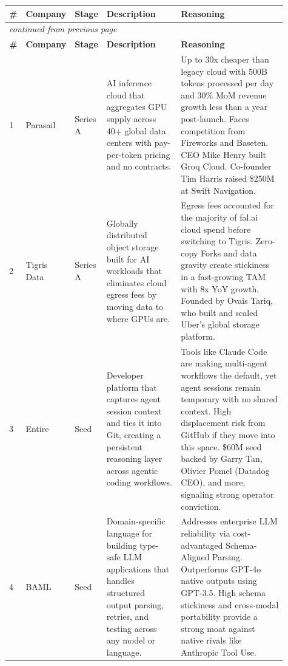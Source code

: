 \documentclass[11pt, letterpaper]{article}
\begin{document}
\begin{longtable}{@{} p{0.04\linewidth} p{0.10\linewidth} p{0.07\linewidth}
                      p{0.28\linewidth} p{0.42\linewidth} @{}}
  \toprule
  \textbf{\#} &
  \textbf{Company} &
  \textbf{Stage} &
  \textbf{Description} &
  \textbf{Reasoning} \\
  \midrule
  \endfirsthead

  \multicolumn{5}{l}{\small\textit{continued from previous page}} \\
  \toprule
  \textbf{\#} & \textbf{Company} & \textbf{Stage} &
  \textbf{Description} & \textbf{Reasoning} \\
  \midrule
  \endhead

  \bottomrule
  \endfoot

  1 & Parasail & Series A &
  AI inference cloud that aggregates GPU supply across 40+ global data centers
  with pay-per-token pricing and no contracts. &
  Up to 30x cheaper than legacy cloud with 500B tokens processed per day and
  30\% MoM revenue growth less than a year post-launch. Faces competition from
  Fireworks and Baseten. CEO Mike Henry built Groq Cloud. Co-founder Tim Harris
  raised \$250M at Swift Navigation. \\[0.5em]

  2 & Tigris Data & Series A &
  Globally distributed object storage built for AI workloads that eliminates
  cloud egress fees by moving data to where GPUs are. &
  Egress fees accounted for the majority of fal.ai cloud spend before switching
  to Tigris. Zero-copy Forks and data gravity create stickiness in a
  fast-growing TAM with 8x YoY growth. Founded by Ovais Tariq, who built and
  scaled Uber's global storage platform. \\[0.5em]

  3 & Entire & Seed &
  Developer platform that captures agent session context and ties it into Git,
  creating a persistent reasoning layer across agentic coding workflows. &
  Tools like Claude Code are making multi-agent workflows the default, yet agent
  sessions remain temporary with no shared context. High displacement risk from
  GitHub if they move into this space. \$60M seed backed by Garry Tan, Olivier
  Pomel (Datadog CEO), and more, signaling strong operator conviction. \\[0.5em]

  4 & BAML & Seed &
  Domain-specific language for building type-safe LLM applications that handles
  structured output parsing, retries, and testing across any model or language. &
  Addresses enterprise LLM reliability via cost-advantaged Schema-Aligned
  Parsing. Outperforms GPT-4o native outputs using GPT-3.5. High schema
  stickiness and cross-modal portability provide a strong moat against native
  rivals like Anthropic Tool Use. \\[0.5em]


\end{longtable}
\end{document}
